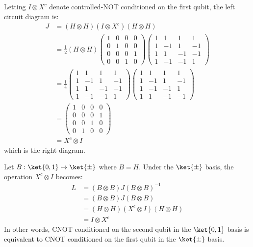 \begingroup
%
\par Letting $I \otimes X^c$ denote controlled-NOT conditioned on the first qubit, the left circuit diagram is:
%
\begin{align*}
J &= \left( H \otimes H \right) \left( I \otimes X^c \right) \left( H \otimes H \right) \\
&= \frac12 \left( H \otimes H \right) \begin{pmatrix} 1 & 0 & 0 & 0 \\ 0 & 1 & 0 & 0 \\ 0 & 0 & 0 & 1 \\ 0 & 0 & 1 & 0 \end{pmatrix} \begin{pmatrix} 1 & 1 & 1 & 1 \\ 1 & -1 & 1 & -1 \\ 1 & 1 & -1 & -1 \\ 1 & -1 & -1 & 1 \end{pmatrix} \\
&= \frac14 \begin{pmatrix} 1 & 1 & 1 & 1 \\ 1 & -1 & 1 & -1 \\ 1 & 1 & -1 & -1 \\ 1 & -1 & -1 & 1 \end{pmatrix} \begin{pmatrix} 1 & 1 & 1 & 1 \\ 1 & -1 & 1 & -1 \\ 1 & -1 & -1 & 1 \\ 1 & 1 & -1 & -1 \end{pmatrix} \\
&= \begin{pmatrix} 1 & 0 & 0 & 0 \\ 0 & 0 & 0 & 1 \\ 0 & 0 & 1 & 0 \\ 0 & 1 & 0 & 0 \end{pmatrix} \\
&= X^c \otimes I
\end{align*}
%
which is the right diagram.
%
\par Let $B : \ket{0,1} \mapsto \ket{\pm}$ where $B = H$.
%
Under the $\ket{\pm}$ basis, the operation $X^c \otimes I$ becomes:
%
\begin{align*}
L &= \left( B \otimes B \right) J \left( B \otimes B \right)^{-1} \\
&= \left( B \otimes B \right) J \left( B \otimes B \right) \\
&= \left( H \otimes H \right) \left( X^c \otimes I \right) \left( H \otimes H \right) \\
&= I \otimes X^c
\end{align*}
%
In other words, CNOT conditioned on the second qubit in the $\ket{0, 1}$ basis is equivalent to CNOT conditioned on the first qubit in the $\ket{\pm}$ basis.
%
\endgroup
